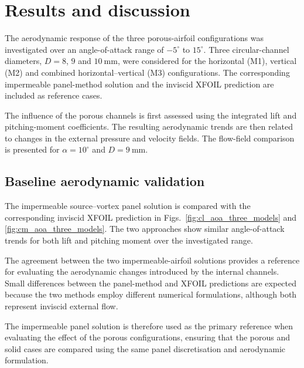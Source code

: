 \documentclass[a4paper,fleqn]{cas-dc}
\begin{document}

\section{Results and discussion}
\label{sec:results_discussion}

The aerodynamic response of the three porous-airfoil configurations was
investigated over an angle-of-attack range of $-5^\circ$ to
$15^\circ$. Three circular-channel diameters,
$D=8$, $9$ and $10~\mathrm{mm}$, were considered for the horizontal
(M1), vertical (M2) and combined horizontal--vertical (M3)
configurations. The corresponding impermeable panel-method solution
and the inviscid XFOIL prediction are included as reference cases.

The influence of the porous channels is first assessed using the
integrated lift and pitching-moment coefficients. The resulting
aerodynamic trends are then related to changes in the external pressure
and velocity fields. The flow-field comparison is presented for
$\alpha=10^\circ$ and $D=9~\mathrm{mm}$.



\subsection{Baseline aerodynamic validation}
\label{subsec:baseline_validation}

The impermeable source--vortex panel solution is compared with the
corresponding inviscid XFOIL prediction in
Figs.~\ref{fig:cl_aoa_three_models} and
\ref{fig:cm_aoa_three_models}. The two approaches show similar
angle-of-attack trends for both lift and pitching moment over the
investigated range.

The agreement between the two impermeable-airfoil solutions provides
a reference for evaluating the aerodynamic changes introduced by the
internal channels. Small differences between the panel-method and
XFOIL predictions are expected because the two methods employ
different numerical formulations, although both represent inviscid
external flow.

The impermeable panel solution is therefore used as the primary
reference when evaluating the effect of the porous configurations,
ensuring that the porous and solid cases are compared using the same
panel discretisation and aerodynamic formulation.
\end{document}
